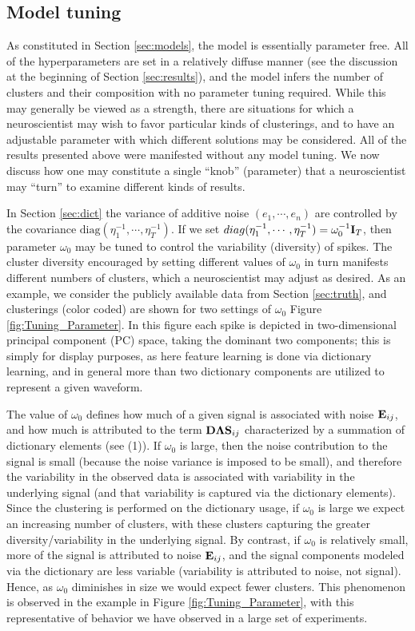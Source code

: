\documentclass[journal]{IEEEtran}
\begin{document}
\subsection{Model tuning}

As constituted in Section \ref{sec:models}, the model is essentially parameter free. All of the hyperparameters are set in a relatively diffuse manner (see the discussion at the beginning of Section \ref{sec:results}), and the model infers the number of clusters and their composition with no parameter tuning required. While this may generally be viewed as a strength, there are situations for which a neuroscientist may wish to favor particular kinds of clusterings, and to have an adjustable parameter with which different solutions may be considered. All of the results presented above were manifested without any model tuning. We now discuss how one may constitute a single ``knob'' (parameter) that a neuroscientist may ``turn'' to examine different kinds of results.


In Section \ref{sec:dict} the variance of additive noise $(e_1,\cdots, e_n)$ are controlled by the covariance $\mbox{diag}(\eta_1^{-1},\cdots, \eta_T^{-1})$. If we set $\relax{diag}(\eta_1^{-1},\cdots, \eta_T^{-1})=\omega_0^{-1}{\mathbf I}_T$, then parameter $\omega_0$ may be tuned to control the variability (diversity) of spikes. The cluster diversity encouraged by setting different values of $\omega_0$ in turn manifests different numbers of clusters, which a neuroscientist may adjust as desired. As an example, we consider the publicly available data from Section \ref{sec:truth}, and clusterings (color coded) are shown for two settings of $\omega_0$  Figure \ref{fig:Tuning_Parameter}. In this figure\add{,} each spike is depicted in two-dimensional principal component (PC) space, taking the dominant two components; this is simply for display purposes, as here feature learning is done via dictionary learning, and in general more than two dictionary components are utilized to represent a given waveform.

The value of $\omega_0$ defines how much of a given signal is associated with noise ${\mathbf E}_{ij}$, and how much is attributed to the term ${\mathbf D}\boldsymbol{\Lambda}{\mathbf S}_{ij}$ characterized by a summation of dictionary elements (see (1)). If $\omega_0$ is large, then the noise contribution to the signal is small (because the noise variance is imposed to be small), and therefore the variability in the observed data is associated with variability in the underlying signal (and that variability is captured via the dictionary elements). Since the clustering is performed on the dictionary usage, if $\omega_0$ is large we expect an increasing number of clusters, with these clusters capturing the greater diversity/variability in the underlying signal. By contrast, if $\omega_0$ is relatively small, more of the signal is attributed to noise ${\mathbf E}_{ij}$, and the signal components modeled via the dictionary are less variable (variability is attributed to noise, not signal). Hence, as $\omega_0$ diminishes in size we would expect fewer clusters. This phenomenon is observed in the example in Figure \ref{fig:Tuning_Parameter}, with this representative of behavior we have observed in a large set of experiments.
\end{document}
